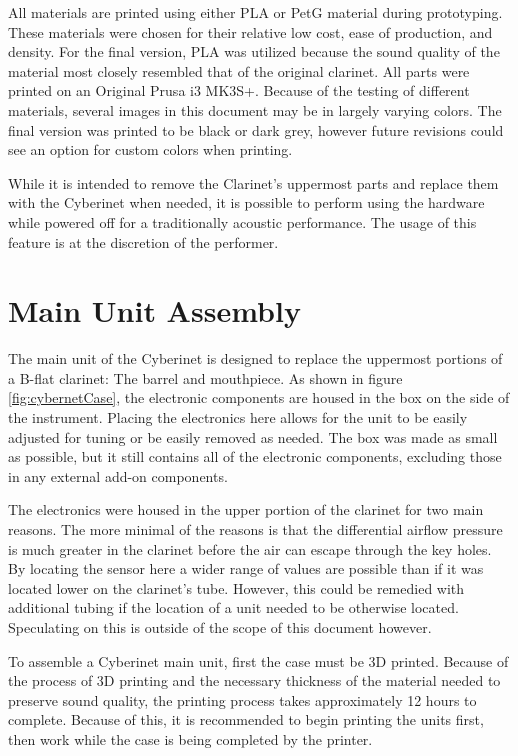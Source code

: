 All materials are printed using either PLA or PetG material during prototyping. These materials were chosen for their relative low cost, ease of production, and density. For the final version, PLA was utilized because the sound quality of the material most closely resembled that of the original clarinet. All parts were printed on an Original Prusa i3 MK3S+. Because of the testing of different materials, several images in this document may be in largely varying colors. The final version was printed to be black or dark grey, however future revisions could see an option for custom colors when printing. 

While it is intended to remove the Clarinet's uppermost parts and replace them with the Cyberinet when needed, it is possible to perform using the hardware while powered off for a traditionally acoustic performance. The usage of this feature is at the discretion of the performer.

\section{Main Unit Assembly}

The main unit of the Cyberinet is designed to replace the uppermost portions of a B-flat clarinet: The barrel and mouthpiece. As shown in figure \ref{fig:cybernetCase}, the electronic components are housed in the box on the side of the instrument. Placing the electronics here allows for the unit to be easily adjusted for tuning or be easily removed as needed. The box was made as small as possible, but it still contains all of the electronic components, excluding those in any external add-on components. 

The electronics were housed in the upper portion of the clarinet for two main reasons. The more minimal of the reasons is that the differential airflow pressure is much greater in the clarinet before the air can escape through the key holes. By locating the sensor here a wider range of values are possible than if it was located lower on the clarinet's tube. However, this could be remedied with additional tubing if the location of a unit needed to be otherwise located. Speculating on this is outside of the scope of this document however.

To assemble a Cyberinet main unit, first the case must be 3D printed. Because of the process of 3D printing and the necessary thickness of the material needed to preserve sound quality, the printing process takes approximately 12 hours to complete. Because of this, it is recommended to begin printing the units first, then work while the case is being completed by the printer.

